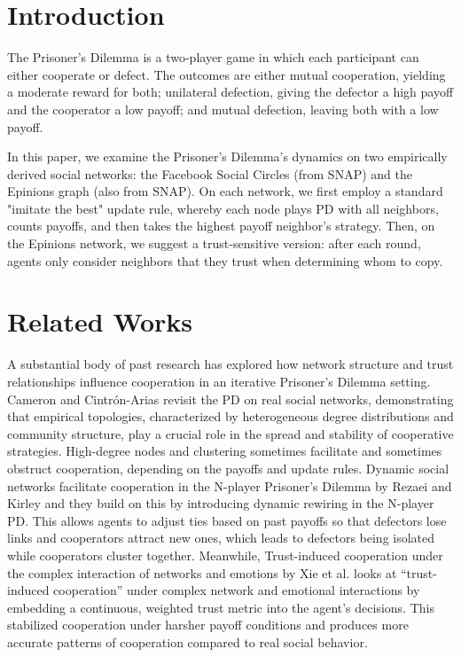 \section{Introduction}
The Prisoner’s Dilemma is a two‐player game in which each participant can either cooperate or defect. The outcomes are either mutual cooperation, yielding a moderate reward for both; unilateral defection, giving the defector a high payoff and the cooperator a low payoff; and mutual defection, leaving both with a low payoff. 

In this paper, we examine the Prisoner's Dilemma’s dynamics on two empirically derived social networks: the Facebook Social Circles (from SNAP) and the Epinions graph (also from SNAP). On each network, we first employ a standard "imitate the best" update rule, whereby each node plays PD with all neighbors, counts payoffs, and then takes the highest payoff neighbor's strategy. Then, on the Epinions network, we suggest a trust‐sensitive version: after each round, agents only consider neighbors that they trust when determining whom to copy.

\section{Related Works}
A substantial body of past research has explored how network structure and trust relationships influence cooperation in an iterative Prisoner’s Dilemma setting. Cameron and Cintrón-Arias revisit the PD on real social networks, demonstrating that empirical topologies, characterized by heterogeneous degree distributions and community structure, play a crucial role in the spread and stability of cooperative strategies. High-degree nodes and clustering sometimes facilitate and sometimes obstruct cooperation, depending on the payoffs and update rules. Dynamic social networks facilitate cooperation in the N-player Prisoner’s Dilemma by Rezaei and Kirley and they build on this by introducing dynamic rewiring in the N-player PD. This allows agents to adjust ties based on past payoffs so that defectors lose links and cooperators attract new ones, which leads to defectors being isolated while cooperators cluster together. Meanwhile, Trust-induced cooperation under the complex interaction of networks and emotions by Xie et al. looks at “trust-induced cooperation” under complex network and emotional interactions by embedding a continuous, weighted trust metric into the agent’s decisions. This stabilized cooperation under harsher payoff conditions and produces more accurate patterns of cooperation compared to real social behavior.


